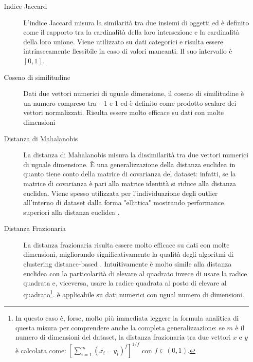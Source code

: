 \begin{description}
\item[Indice Jaccard] L'indice Jaccard \cite{jaccard} misura la similarit\`a tra due insiemi di oggetti ed \`e definito come il rapporto tra la cardinalit\`a della loro intersezione e la cardinalit\`a della loro unione. Viene utilizzato su dati categorici e risulta essere intrinsecamente flessibile in caso di valori mancanti. Il suo intervallo \`e $ [0, 1] $.

\item[Coseno di similitudine] Dati due vettori numerici di uguale dimensione, il coseno di similitudine \`e un numero compreso tra $ -1 $ e $ 1 $ ed \`e definito come prodotto scalare dei vettori normalizzati. Risulta essere molto efficace su dati con molte dimensioni \cite{ertoez02}

\item[Distanza di Mahalanobis] La distanza di Mahalanobis misura la dissimilarit\`a tra due vettori numerici di uguale dimensione. \`E una generalizzazione della distanza euclidea in quanto tiene conto della matrice di covarianza del dataset: infatti, se la matrice di covarianza \`e pari alla matrice identit\`a si riduce alla distanza euclidea. Viene spesso utilizzata per l'individuazione degli outlier all'interno di dataset dalla forma "ellittica" mostrando performance superiori alla distanza euclidea \cite{mahalanobis}.

\item[Distanza Frazionaria] La distanza frazionaria risulta essere molto efficace su dati con molte dimensioni, migliorando significativamente la qualit\`a degli algoritmi di clustering distance-based \cite{Aggarwal01}. Intuitivamente \`e molto simile alla distanza euclidea con la particolarit\`a di elevare al quadrato invece di usare la radice quadrata e, viceversa, usare la radice quadrata al posto di elevare al quadrato\footnote{In questo caso \`e, forse, molto pi\`u immediata leggere la formula analitica di questa misura per comprendere anche la completa generalizzazione: se $ m $ \`e il numero di dimensioni del dataset, la distanza frazionaria tra due vettori $ x $ e $ y $ \`e calcolata come: $ [\sum\limits_{i=1}^m (x_{i} - y_{i})^{f}]^{1/f} $ con $ f \in (0,1) $.}. \`e applicabile su dati numerici con ugual numero di dimensioni.
\end{description}


